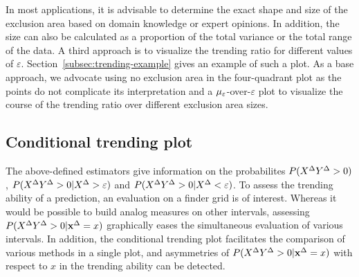 In most applications, it is advisable to determine the exact shape and size of the exclusion area based on domain knowledge or expert opinions.
In addition, the size can also be calculated as a proportion of the total variance or the total range of the data.
A third approach is to visualize the trending ratio for different values of $\varepsilon$.
Section~\ref{subsec:trending-example} gives an example of such a plot.
As a base approach, we advocate using no exclusion area in the four-quadrant plot as the points do not complicate its interpretation and a $\mu_{\varepsilon}$-over-$\varepsilon$ plot to visualize the course of the trending ratio over different exclusion area sizes.


\subsection{Conditional trending plot}\label{subsec:trending-cond-prob}
The above-defined estimators give information on the probabilites $P(X^{\Delta} Y^{\Delta} > 0)$, $P(X^{\Delta} Y^{\Delta} > 0 | X^{\Delta} > \varepsilon)$ and $P(X^{\Delta} Y^{\Delta} > 0 | X^{\Delta} < \varepsilon)$.
To assess the trending ability of a prediction, an evaluation on a finder grid is of interest.
Whereas it would be possible to build analog measures on other intervals, assessing $P(X^{\Delta} Y^{\Delta} > 0 | \mathbf{x}^{\Delta} = x)$ graphically eases the simultaneous evaluation of various intervals.
In addition, the conditional trending plot facilitates the comparison of various methods in a single plot, and asymmetries of $P(X^{\Delta} Y^{\Delta} > 0 | \mathbf{x}^{\Delta} = x)$ with respect to $x$ in the trending ability can be detected.

